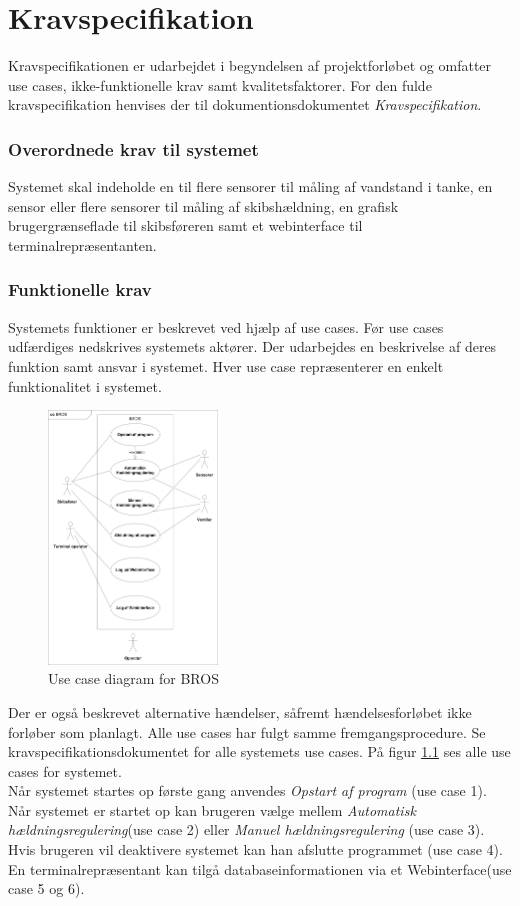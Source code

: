 \chapter{Kravspecifikation}
\label{ch:kravspecikikation}
Kravspecifikationen er udarbejdet i begyndelsen af projektforløbet og omfatter use cases, ikke-funktionelle krav samt kvalitetsfaktorer. For den fulde kravspecifikation henvises der til dokumentionsdokumentet \textit{Kravspecifikation}.

\subsection{Overordnede krav til systemet}
Systemet skal indeholde en til flere sensorer til måling af vandstand i tanke, en sensor eller flere sensorer til måling af skibshældning, en grafisk brugergrænseflade til skibsføreren samt et webinterface til terminalrepræsentanten.

\subsection{Funktionelle krav}
Systemets funktioner er beskrevet ved hjælp af use cases. Før use cases udfærdiges nedskrives systemets aktører. Der udarbejdes en beskrivelse af deres funktion samt ansvar i systemet. Hver use case repræsenterer en enkelt funktionalitet i systemet.
\begin{figure}[H]
\centering
\includegraphics[width=0.4\textwidth]{billeder/UCDBROS}
\caption{Use case diagram for BROS}
\label{fig:UCDBROS}
\end{figure}
Der er også beskrevet alternative hændelser, såfremt hændelsesforløbet ikke forløber som planlagt. Alle use cases har fulgt samme fremgangsprocedure. Se kravspecifikationsdokumentet for alle systemets use cases. På figur \ref{fig:UCDBROS} ses alle use cases for systemet.\\
Når systemet startes op første gang anvendes \textit{Opstart af program} (use case 1). Når systemet er startet op kan brugeren vælge mellem \textit{Automatisk hældningsregulering}(use case 2) eller \textit{Manuel hældningsregulering} (use case 3). Hvis brugeren vil deaktivere systemet kan han afslutte programmet (use case 4). En terminalrepræsentant kan tilgå databaseinformationen via et Webinterface(use case 5 og 6).



